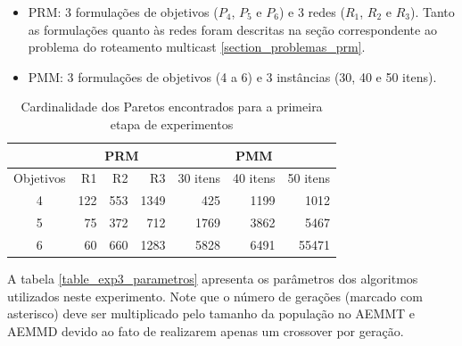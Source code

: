\begin{itemize}
	\item PRM: 3 formulações de objetivos ($P_4$, $P_5$ e $P_6$) e 3 redes ($R_1$, $R_2$ e $R_3$). Tanto as formulações quanto às redes foram descritas na seção correspondente ao problema do roteamento multicast \ref{section_problemas_prm}.
	\item PMM: 3 formulações de objetivos (4 a 6) e 3 instâncias (30, 40 e 50 itens).
\end{itemize}


\begin{table}[!htbp]
	\centering
	\caption{Cardinalidade dos Paretos encontrados para a primeira etapa de experimentos}
	\label{table_exp3_paretos}
	\begin{tabular}{c|rrr|rrr}
		& \multicolumn{3}{c|}{\textbf{PRM}} & \multicolumn{3}{c}{\textbf{PMM}} \\ \hline
		Objetivos & R1         & R2       & R3        & 30 itens  & 40 itens & 50 itens \\ \hline
		4         & 122        & 553       & 1349        & 425       & 1199      & 1012    \\
		5         & 75        & 372      & 712       & 1769      & 3862     & 5467   \\
		6         & 60       & 660      & 1283      & 5828      & 6491   & 55471   \\ \hline
	\end{tabular}
\end{table}

A tabela \ref{table_exp3_parametros} apresenta os parâmetros dos algoritmos utilizados neste experimento. Note que o número de gerações (marcado com asterisco) deve ser multiplicado pelo tamanho da população no AEMMT e AEMMD devido ao fato de realizarem apenas um crossover por geração.

